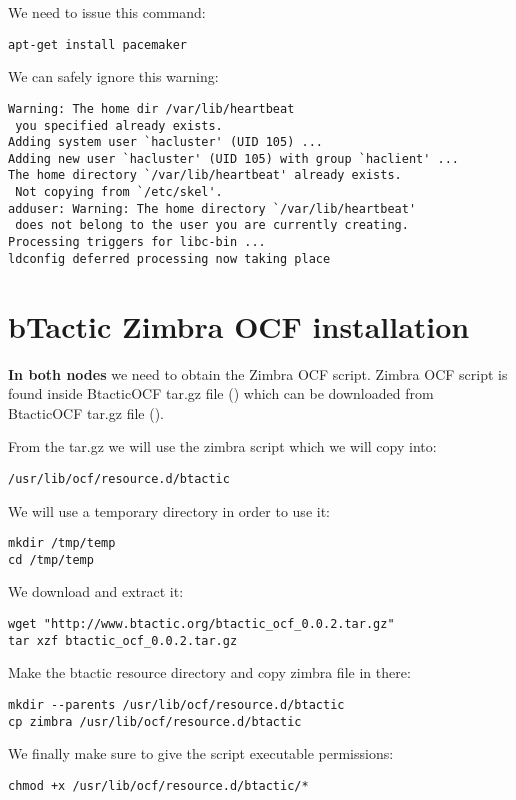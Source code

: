 We need to issue this command:
\begin{verbatim}
apt-get install pacemaker
\end{verbatim}

We can safely ignore this warning:
\begin{verbatim}
Warning: The home dir /var/lib/heartbeat
 you specified already exists.
Adding system user `hacluster' (UID 105) ...
Adding new user `hacluster' (UID 105) with group `haclient' ...
The home directory `/var/lib/heartbeat' already exists.
 Not copying from `/etc/skel'.
adduser: Warning: The home directory `/var/lib/heartbeat'
 does not belong to the user you are currently creating.
Processing triggers for libc-bin ...
ldconfig deferred processing now taking place
\end{verbatim}

\section {bTactic Zimbra OCF installation}
\textbf{In both nodes} we need to obtain the Zimbra OCF script. Zimbra OCF script is found inside BtacticOCF tar.gz file (\cite{BtacticOCF}) which can be downloaded from BtacticOCF  tar.gz file (\cite{BtacticOrg}).

From the tar.gz we will use the zimbra script which we will copy into:
\begin{verbatim}
/usr/lib/ocf/resource.d/btactic
\end{verbatim}

We will use a temporary directory in order to use it:
\begin{verbatim}
mkdir /tmp/temp
cd /tmp/temp
\end{verbatim}
We download and extract it:
\begin{verbatim}
wget "http://www.btactic.org/btactic_ocf_0.0.2.tar.gz"
tar xzf btactic_ocf_0.0.2.tar.gz
\end{verbatim}
Make the btactic resource directory and copy zimbra file in there:
\begin{verbatim}
mkdir --parents /usr/lib/ocf/resource.d/btactic
cp zimbra /usr/lib/ocf/resource.d/btactic
\end{verbatim}
We finally make sure to give the script executable permissions:
\begin{verbatim}
chmod +x /usr/lib/ocf/resource.d/btactic/*
\end{verbatim}


